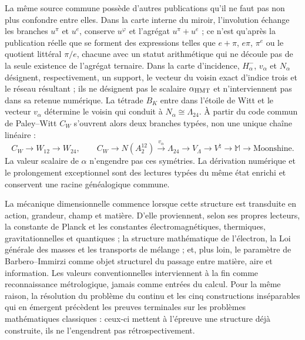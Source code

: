 La même source commune possède d'autres publications qu'il ne faut pas non plus confondre
entre elles. Dans la carte interne du miroir, l'involution échange les branches
\(u^\pi\) et \(u^e\), conserve \(u^\varphi\) et l'agrégat
\(u^\pi+u^e\) ; ce n'est qu'après la publication réelle que se forment des expressions telles que
\(e+\pi\), \(e\pi\), \(\pi^e\) ou le quotient littéral \(\pi/e\), chacune avec
un statut arithmétique qui ne découle pas de la seule existence de l'agrégat
ternaire. Dans la carte
d'incidence, \(H^-_\alpha\), \(v_\alpha\) et \(N_\alpha\) désignent,
respectivement, un support, le vecteur du voisin exact d'indice trois et le
réseau résultant ; ils ne désignent pas le scalaire \(\alpha_{\rm HMT}\) et n'interviennent pas
dans sa retenue numérique. La tétrade \(B_K\) entre dans l'étoile de Witt et le
vecteur \(v_\alpha\) détermine le voisin qui conduit à
\(N_\alpha\cong\Lambda_{24}\). À partir du code commun de Paley--Witt \(C_W\)
s'ouvrent alors deux branches typées, non une unique chaîne linéaire :
\[
 C_W\longrightarrow W_{12}\longrightarrow W_{24},
 \qquad
 C_W\longrightarrow N(A_2^{12})\xrightarrow{\,v_\alpha\,}\Lambda_{24}
 \longrightarrow V_\Lambda\longrightarrow V^\natural
 \longrightarrow\mathbb M\longrightarrow\text{Moonshine}.
\]
La valeur scalaire de \(\alpha\) n'engendre pas ces symétries. La dérivation
numérique et le prolongement exceptionnel sont des lectures typées du même état
enrichi et conservent une racine généalogique commune.

La mécanique dimensionnelle commence lorsque cette structure est transduite en
action, grandeur, champ et matière. D'elle proviennent, selon ses propres
lecteurs, la constante de Planck et les constantes électromagnétiques,
thermiques, gravitationnelles et quantiques ; la structure mathématique de l'électron,
la Loi générale des masses et les transports de mélange ; et, plus loin, le
paramètre de Barbero--Immirzi comme objet structurel du passage entre matière,
aire et information. Les valeurs conventionnelles interviennent à la fin comme
reconnaissance métrologique, jamais comme entrées du calcul. Pour la même
raison, la résolution du problème du continu et les cinq constructions
inséparables qui en émergent précèdent les preuves terminales sur les
problèmes mathématiques classiques : ceux-ci mettent à l'épreuve une structure déjà
construite, ils ne l'engendrent pas rétrospectivement.

